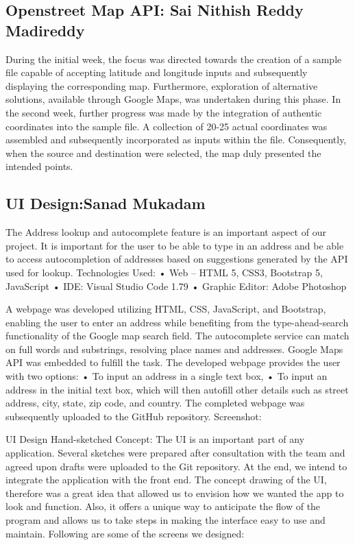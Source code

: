 \documentclass{article}
\begin{document}
\subsection{Openstreet Map API: Sai Nithish Reddy Madireddy}
During the initial week, the focus was directed towards the creation of a sample file capable of accepting latitude and longitude inputs and subsequently displaying the corresponding map. Furthermore, exploration of alternative solutions, available through Google Maps, was undertaken during this phase. In the second week, further progress was made by the integration of authentic coordinates into the sample file. A collection of 20-25 actual coordinates was assembled and subsequently incorporated as inputs within the file. Consequently, when the source and destination were selected, the map duly presented the intended points.


\subsection{UI Design:Sanad Mukadam}
The Address lookup and autocomplete feature is an important aspect of our project. It is important for the user to be able to type in an address and be able to access autocompletion of addresses based on suggestions generated by the API used for lookup.
Technologies Used: 
•	Web – HTML 5, CSS3, Bootstrap 5, JavaScript
•	IDE: Visual Studio Code 1.79
•	Graphic Editor: Adobe Photoshop

A webpage was developed utilizing HTML, CSS, JavaScript, and Bootstrap, enabling the user to enter an address while benefiting from the type-ahead-search functionality of the Google map search field. The autocomplete service can match on full words and substrings, resolving place names and addresses.
Google Maps API was embedded to fulfill the task. The developed webpage provides the user with two options:
•	To input an address in a single text box,
•	To input an address in the initial text box, which will then autofill other details such as street address, city, state, zip code, and country.
The completed webpage was subsequently uploaded to the GitHub repository.
Screenshot:
 
UI Design Hand-sketched Concept:
The UI is an important part of any application. Several sketches were prepared after consultation with the team and agreed upon drafts were uploaded to the Git repository. At the end, we intend to integrate the application with the front end. The concept drawing of the UI, therefore was a great idea that allowed us to envision how we wanted the app to look and function. Also, it offers a unique way to anticipate the flow of the program and allows us to take steps in making the interface easy to use and maintain.
Following are some of the screens we designed:
\end{document}
